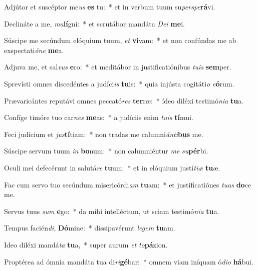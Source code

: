\item Adjútor et suscéptor me\textit{us} \textbf{es} tu:~* et in verbum tuum su\textit{per}\textit{spe}\textbf{rá}vi.
\item Declináte a me, \textit{ma}\textbf{lí}gni:~* et scrutábor mandáta \textit{De}\textit{i} \textbf{me}i.
\item Súscipe me secúndum elóquium tuum, \textit{et} \textbf{vi}vam:~* et non confúndas me ab exspectati\textit{ó}\textit{ne} \textbf{me}a.
\item Adjuva me, et sal\textit{vus} \textbf{e}ro:~* et meditábor in justificatiónibus \textit{tu}\textit{is} \textbf{sem}per.
\item Sprevísti omnes discedéntes a judíci\textit{is} \textbf{tu}is:~* quia injústa cogitáti\textit{o} \textit{e}\textbf{ó}rum.
\item Prævaricántes reputávi omnes peccató\textit{res} \textbf{ter}ræ:~* ídeo diléxi testimó\textit{ni}\textit{a} \textbf{tu}a.
\item Confíge timóre tuo car\textit{nes} \textbf{me}as:~* a judíciis enim \textit{tu}\textit{is} \textbf{tí}mui.
\item Feci judícium et \textit{jus}\textbf{tí}tiam:~* non tradas me calumni\textit{án}\textit{ti}\textbf{bus} me.
\item Súscipe servum tuum \textit{in} \textbf{bo}num:~* non calumniéntur \textit{me} \textit{su}\textbf{pér}bi.
\item Oculi mei defecérunt in salutá\textit{re} \textbf{tu}um:~* et in elóquium justí\textit{ti}\textit{æ} \textbf{tu}æ.
\item Fac cum servo tuo secúndum misericórdi\textit{am} \textbf{tu}am:~* et justificatiónes \textit{tu}\textit{as} \textbf{do}ce me.
\item Servus tuus \textit{sum} \textbf{e}go:~* da mihi intelléctum, ut sciam testimó\textit{ni}\textit{a} \textbf{tu}a.
\item Tempus facién\textit{di}, \textbf{Dó}mine:~* dissipavérunt \textit{le}\textit{gem} \textbf{tu}am.
\item Ideo diléxi mandá\textit{ta} \textbf{tu}a,~* super aurum \textit{et} \textit{to}\textbf{pá}zion.
\item Proptérea ad ómnia mandáta tua di\textit{ri}\textbf{gé}bar:~* omnem viam iníquam ó\textit{di}\textit{o} \textbf{há}bui.
